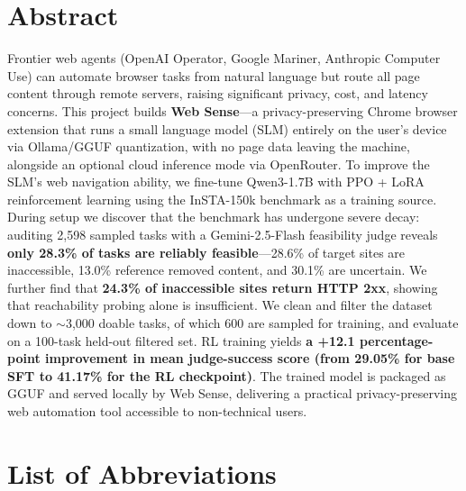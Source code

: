 \documentclass[12pt,a4paper]{report}
\begin{document}
\chapter*{Abstract}
Frontier web agents (OpenAI Operator, Google Mariner, Anthropic Computer Use) can automate browser tasks from natural language but route all page content through remote servers, raising significant privacy, cost, and latency concerns. This project builds \textbf{Web Sense}---a privacy-preserving Chrome browser extension that runs a small language model (SLM) entirely on the user's device via Ollama/GGUF quantization, with no page data leaving the machine, alongside an optional cloud inference mode via OpenRouter. To improve the SLM's web navigation ability, we fine-tune Qwen3-1.7B with PPO + LoRA reinforcement learning using the InSTA-150k benchmark as a training source. During setup we discover that the benchmark has undergone severe decay: auditing 2{,}598 sampled tasks with a Gemini-2.5-Flash feasibility judge reveals \textbf{only 28.3\% of tasks are reliably feasible}---28.6\% of target sites are inaccessible, 13.0\% reference removed content, and 30.1\% are uncertain. We further find that \textbf{24.3\% of inaccessible sites return HTTP 2xx}, showing that reachability probing alone is insufficient. We clean and filter the dataset down to $\sim$3{,}000 doable tasks, of which 600 are sampled for training, and evaluate on a 100-task held-out filtered set. RL training yields \textbf{a +12.1 percentage-point improvement in mean judge-success score (from 29.05\% for base SFT to 41.17\% for the RL checkpoint)}. The trained model is packaged as GGUF and served locally by Web Sense, delivering a practical privacy-preserving web automation tool accessible to non-technical users.

\tableofcontents
\listoffigures
\listoftables

\chapter*{List of Abbreviations}
\end{document}
